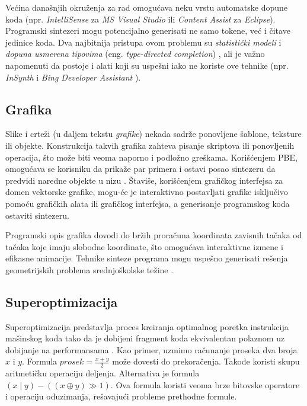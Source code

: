Većina današnjih okruženja za rad omogućava neku vrstu a\-u\-to\-ma\-tske dopune koda (npr. \emph{IntelliSense} za \emph{MS Visual Studio} ili \emph{Content Assist} za \emph{Eclipse}). Programski sintezeri mogu potencijalno generisati ne samo tokene, već i čitave jedinice koda. Dva najbitnija pristupa ovom problemu su \emph{statistički modeli} \cite{CCWSLM} i \emph{dopuna usmerena tipovima} (eng. \emph{type-directed completion}) \cite{TDCOPE}, ali je važno napomenuti da postoje i alati koji su uspešni iako ne koriste ove tehnike (npr. \emph{InSynth} \cite{IS} i \emph{Bing Developer Assistant} \cite{BDA}).


\subsection{Grafika}
\label{subsec:Grafika}

Slike i crteži (u daljem tekstu \emph{grafike}) nekada sadrže ponovljene šablone, teksture ili objekte. Konstrukcija takvih grafika zahteva pisanje skriptova ili ponovljenih operacija, što može biti veoma naporno i podložno greškama. Korišćenjem PBE, omogućava se korisniku da prikaže par primera i ostavi posao sintezeru da predvidi naredne objekte u nizu \cite{Backpropagation}. Štaviše, korišćenjem grafičkog interfejsa za domen vektorske grafike, mogu-će je interaktivno postavljati grafike isključivo pomoću grafičkih alata ili grafičkog interfejsa, a generisanje programskog koda ostaviti sintezeru.

Programski opis grafika dovodi do bržih proračuna koordinata zavisnih tačaka od tačaka koje imaju slobodne koordinate, što omogućava interaktivne izmene i efikasne animacije. Tehnike sinteze programa mogu uspešno generisati rešenja geometrijskih problema sre\-dnjo\-ško\-lske težine \cite{SynthesizingGeometryConstructions}.


\subsection{Superoptimizacija}
\label{subsec:Superoptimizacija}

Superoptimizacija predstavlja proces kreiranja optimalnog poretka instrukcija mašinskog koda tako da je dobijeni fragment koda ekvivalentan polaznom uz dobijanje na performansama \cite{Superoptimizer}. Kao primer, uzmimo računanje proseka dva broja $x$ i $y$. Formula $\mathit{prosek}=\frac{x+y}{2}$ može dovesti do prekoračenja. Takođe koristi skupu aritmetičku operaciju deljenja. Alternativa je formula $(x \mid y)-((x \oplus y) \gg 1)$. Ova formula koristi veoma brze bitovske operatore i operaciju oduzimanja, rešavajući probleme prethodne formule.

